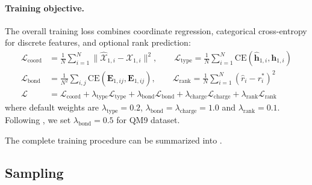\documentclass{article}
\theoremstyle{plain}
\theoremstyle{definition}
\theoremstyle{remark}
\newcommand{\1}{\mathbf{1}}
\newcommand{\X}{\mathcal{X}}
\begin{document}
\paragraph{Training objective.}
The overall training loss combines coordinate regression, categorical cross-entropy for discrete features, and optional rank prediction:
\begin{align}
    \mathcal{L}_{\text{coord}} &= \frac{1}{N} \sum_{i=1}^{N} \|\hat{\X}_{1,i} - \X_{1,i}\|^2, \qquad 
    \mathcal{L}_{\text{type}} = \frac{1}{N} \sum_{i=1}^{N} \text{CE}(\hat{\mathbf{h}}_{1,i}, \mathbf{h}_{1,i}) \\
    \mathcal{L}_{\text{bond}} &= \frac{1}{N^2} \sum_{i,j} \text{CE}(\hat{\mathbf{E}}_{1,ij}, \mathbf{E}_{1,ij}), \qquad 
    \mathcal{L}_{\text{rank}} = \frac{1}{N} \sum_{i=1}^{N} (\hat{r}_i - r_i^*)^2\\
    \mathcal{L} &= \mathcal{L}_{\text{coord}} + \lambda_{\text{type}} \mathcal{L}_{\text{type}} + \lambda_{\text{bond}} \mathcal{L}_{\text{bond}} + \lambda_{\text{charge}} \mathcal{L}_{\text{charge}} + \lambda_{\text{rank}} \mathcal{L}_{\text{rank}}
\end{align}
where default weights are $\lambda_{\text{type}} = 0.2 $, $ \lambda_{\text{bond}} = \lambda_{\text{charge}} = 1.0$ and $\lambda_{\text{rank}} = 0.1$. Following \cite{irwin2024semlaflow}, we set $\lambda_{\text{bond}}=0.5$ for QM9 dataset.

The complete training procedure can be summarized into .

\subsection{Sampling} 
\end{document}
